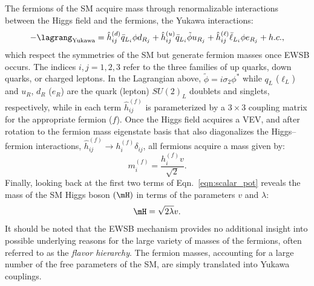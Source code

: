 The fermions of the SM acquire mass through renormalizable interactions between the Higgs field and the fermions, \ie the Yukawa interactions:
\begin{equation*}
    -\lagrang_\text{Yukawa} = \hat{h}^{(d)}_{ij} \bar{q}_{L_i} \phi d_{R_j} +
    \hat{h}^{(u)}_{ij} \bar{q}_{L_i} \tilde{\phi} u_{R_j} +
    \hat{h}^{(\ell)}_{ij} \bar{\ell}_{L_i} \phi e_{R_j} + h.c.,
\end{equation*}
which respect the symmetries of the SM but generate fermion masses once EWSB occurs.
The indices $i,j = 1,2,3$ refer to the three families of up quarks, down quarks, or charged leptons.
In the Lagrangian above, $\tilde{\phi} = i\sigma_2\phi^*$ while $q_L$ ($\ell_L$) and $u_R$, $d_R$ ($e_R$) are the quark (lepton) $SU(2)_L$ doublets and singlets, respectively, while in each term $\hat{h}^{(f)}_{{ij}}$ is parameterized by a $3\times3$ coupling matrix for the appropriate fermion ($f$).
Once the Higgs field acquires a VEV, and after rotation to the fermion mass eigenstate basis that also diagonalizes the Higgs--fermion interactions, $\hat{h}^{(f)}_{ij} \rightarrow h^{(f)}_{i} \delta_{ij}$, all fermions acquire a mass given by:
\begin{equation*}
    m^{(f)}_{i} = \frac{h^{(f)}_{i} v}{\sqrt{2}}.
\end{equation*}
Finally, looking back at the first two terms of Eqn.~\ref{eqn:scalar_pot} reveals the mass of the SM Higgs boson $(\mH)$ in terms of the parameters $v$ and $\lambda$:
\begin{equation*}
    \mH = \sqrt{2 \lambda} v.
\end{equation*}
It should be noted that the EWSB mechanism provides no additional insight into possible underlying reasons for the large variety of masses of the fermions, often referred to as the \emph{flavor hierarchy}.
The fermion masses, accounting for a large number of the free parameters of the SM, are simply translated into Yukawa couplings.



